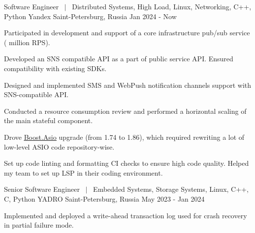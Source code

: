 

\begin{cventries}

    \cventry
    {
        Software Engineer $~\mid~$
        Distributed Systems, High Load,
        Linux, Networking, C++, Python
    } %
    {Yandex} %
    {Saint-Petersburg, Russia} %
    {Jan 2024 - Now} %
    {
        \begin{cvitems}
          \item {
              Participated in development and support of a core infrastructure pub/sub service
              ( million RPS).
          }
          \item {
              Developed an SNS compatible API as a part of public service API. Ensured compatibility
              with existing SDKs.
          }
          \item {
              Designed and implemented SMS and WebPush notification channels support with SNS-compatible API.
          }
          \item {
              Conducted a resource consumption review and performed a horizontal scaling of the main
              stateful component.
          }
          \item {
              Drove \underline{\href{https://www.boost.org/doc/libs/1_87_0/doc/html/boost_asio.html}{Boost.Asio}}
              upgrade (from 1.74 to 1.86), which required rewriting a lot of low-level ASIO code
              repository-wise.
          }
          \item {
              Set up code linting and formatting CI checks to ensure high code quality.
              Helped my team to set up LSP in their coding environment.
          }
        \end{cvitems}
    }

    \cventry
    {
        Senior Software Engineer $~\mid~$
        Embedded Systems, Storage Systems,
        Linux, C++, C, Python
    } %
    {YADRO} %
    {Saint-Petersburg, Russia} %
    {May 2023 - Jan 2024} %
    {
        \begin{cvitems}
          \item {
            Implemented and deployed a write-ahead transaction log used for crash
            recovery in partial failure mode.
          }
        \end{cvitems}
    }


\end{cventries}
